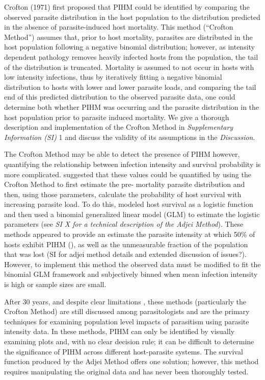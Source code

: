 \documentclass[12pt, a4paper]{article}
\begin{document}
Crofton (1971) first proposed that PIHM could be identified by comparing the
observed parasite distribution in the host population to the distribution
predicted in the absence of parasite-induced host mortality. This method
(“Crofton Method”) assumes that, prior to host mortality, parasites are
distributed in the host population following a negative binomial distribution;
however, as intensity dependent pathology removes heavily infected hosts from
the population, the tail of the distribution is truncated. Mortality is assumed
to not occur in hosts with low intensity infections, thus by iteratively
fitting a negative binomial distribution to hosts with lower and lower parasite
loads, and comparing the tail end of this predicted distribution to the
observed parasite data, one could determine both whether PIHM was occurring and
the parasite distribution in the host population prior to parasite induced
mortality. We give a thorough description and implementation of the Crofton
Method in \emph{Supplementary Information (SI)} 1 and discuss the validity of
its assumptions in the \emph{Discussion}.

The Crofton Method may be able to detect the presence of PIHM however,
quantifying the relationship between infection intensity and survival
probability is more complicated. \cite{Adjei1986} suggested that these values
could be quantified by using the Crofton Method to first estimate the pre-
mortality parasite distribution and then, using those parameters, calculate the
probability of host survival with increasing parasite load. To do this,
\cite{Adjei1986} modeled host survival as a logistic function and then used a
binomial generalized linear model (GLM) to estimate the logistic parameters (see \emph{SI X for a technical description of the Adjei Method}).
These methods appeared to provide an estimate the parasite intensity at which
50\% of hosts exhibit PIHM (), as well as the unmeasurable fraction of the
population that was lost (SI for adjei method details and extended discussion
of issues?). However, to implement this method the observed data must be
modified to fit the binomial GLM framework and subjectively binned when mean
infection intensity is high or sample sizes are small.

After 30 years, and despite clear limitations \citep{McCallum2000a}, these
methods (particularly the Crofton Method) are still discussed among
parasitologists and are the primary techniques for examining population level
impacts of parasitism using parasite intensity data. In these methods, PIHM can
only be identified by visually examining plots and, with no clear decision
rule; it can be difficult to determine the significance of PIHM across
different host-parasite systems. The survival function produced by the Adjei
Method offers one solution; however, this method requires manipulating the
original data and has never been thoroughly tested.
\end{document}
